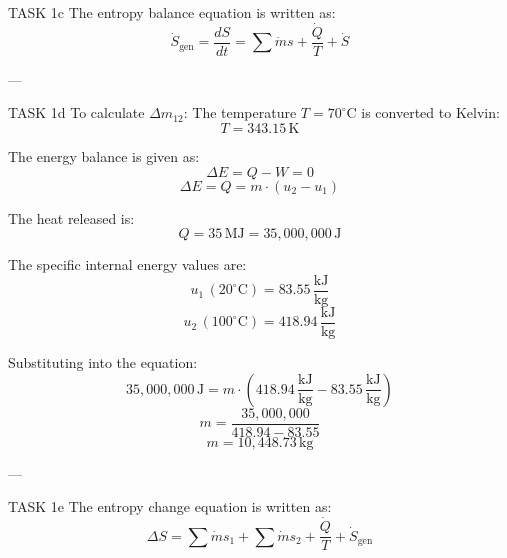 TASK 1c  
The entropy balance equation is written as:  
\[
\dot{S}_{\text{gen}} = \frac{dS}{dt} = \sum \dot{m}s + \frac{\dot{Q}}{T} + \dot{S}
\]  

---

TASK 1d  
To calculate \( \Delta m_{12} \):  
The temperature \( T = 70^\circ\text{C} \) is converted to Kelvin:  
\[
T = 343.15 \, \text{K}
\]  

The energy balance is given as:  
\[
\Delta E = Q - W = 0
\]  
\[
\Delta E = Q = m \cdot (u_2 - u_1)
\]  

The heat released is:  
\[
Q = 35 \, \text{MJ} = 35,000,000 \, \text{J}
\]  

The specific internal energy values are:  
\[
u_1 \, (20^\circ\text{C}) = 83.55 \, \frac{\text{kJ}}{\text{kg}}
\]  
\[
u_2 \, (100^\circ\text{C}) = 418.94 \, \frac{\text{kJ}}{\text{kg}}
\]  

Substituting into the equation:  
\[
35,000,000 \, \text{J} = m \cdot \left(418.94 \, \frac{\text{kJ}}{\text{kg}} - 83.55 \, \frac{\text{kJ}}{\text{kg}}\right)
\]  
\[
m = \frac{35,000,000}{418.94 - 83.55}
\]  
\[
m = 10,448.73 \, \text{kg}
\]  

---

TASK 1e  
The entropy change equation is written as:  
\[
\Delta S = \sum \dot{m}s_1 + \sum \dot{m}s_2 + \frac{\dot{Q}}{T} + \dot{S}_{\text{gen}}
\]  